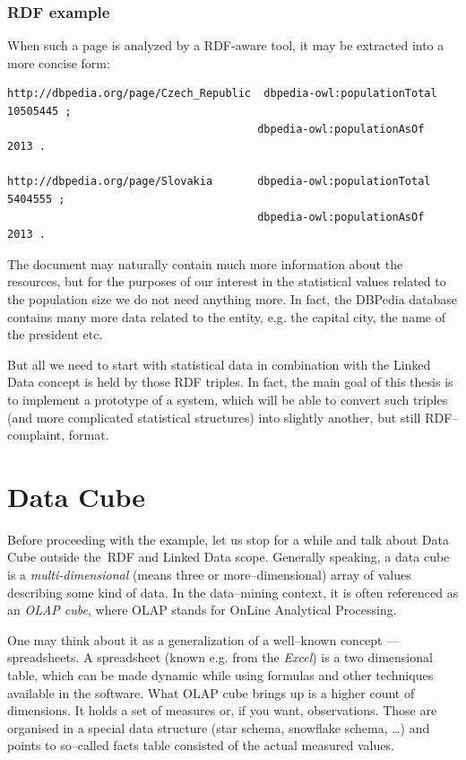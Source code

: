 \subsubsection{RDF example}

When such a page is analyzed by a RDF-aware tool, it may be extracted into a more concise form:

\scriptsize\begin{verbatim}
http://dbpedia.org/page/Czech_Republic	dbpedia-owl:populationTotal		10505445 ;
                                       dbpedia-owl:populationAsOf		2013 .

http://dbpedia.org/page/Slovakia       dbpedia-owl:populationTotal		5404555 ;
                                       dbpedia-owl:populationAsOf		2013 .
\end{verbatim}\normalsize

The document may naturally contain much more information about the resources, but for the
purposes of our interest in the statistical values related to the population size we do not
need anything more. In fact, the DBPedia database contains many more data related to the entity,
e.g. the capital city, the name of the president etc.

But all we need to start with statistical data in combination with the Linked Data concept is held
by those RDF triples. In fact, the main goal of this thesis is to implement a prototype of a 
system, which will be able to convert such triples (and more complicated statistical structures) into
slightly another, but still RDF--complaint, format.

\section{Data Cube}
Before proceeding with the example, let us stop for a while and talk about Data Cube outside
the~RDF and Linked Data scope. Generally speaking, a data cube is a \emph{multi-dimensional}
(means three or more--dimensional) array of values describing some kind of data. In the
data--mining context, it is often referenced as an \emph{OLAP cube}, where OLAP stands for OnLine
Analytical Processing.

One may think about it as a generalization of a well--known concept --- spreadsheets.
A spreadsheet (known e.g. from the \emph{Excel}) is a two dimensional table, which can be
made dynamic while using formulas and other techniques available in the software. What
OLAP cube brings up is a higher count of dimensions. It holds a set of measures or, if you
want, observations. Those are organised in a special data structure (star schema, snowflake
schema, …) and points to so--called facts table consisted of the actual measured values.

